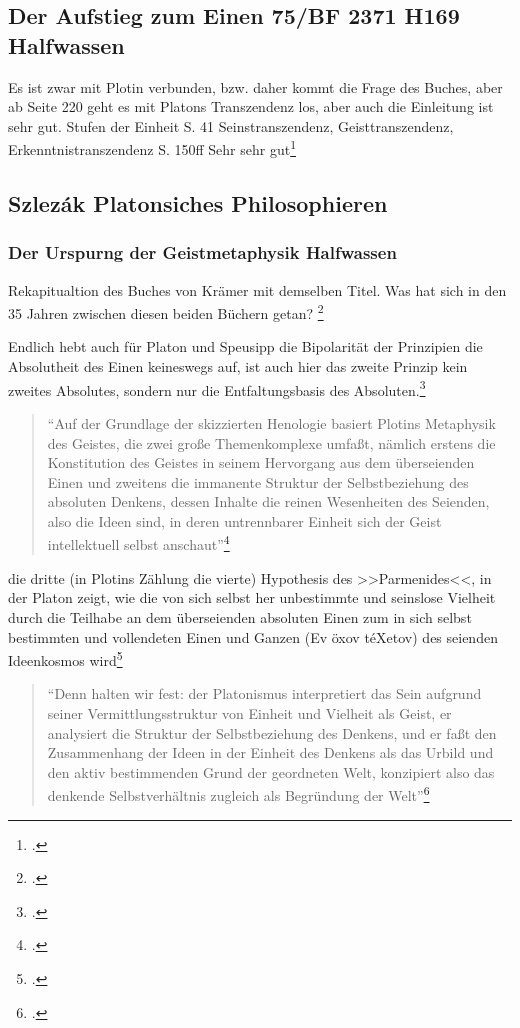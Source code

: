 \documentclass[12pt]{article}
\newcommand*{\zitatblock}[1]{%
    \begin{quote}
    \fontsize{10}{12}\selectfont
    \setlength{\parskip}{1.0em}
    #1
    \end{quote}
}
\begin{document}
\subsection*{Der Aufstieg zum Einen 75/BF 2371 H169 Halfwassen}
Es ist zwar mit Plotin verbunden, bzw. daher kommt die Frage des Buches, aber ab Seite 220 geht es mit Platons Transzendenz los, aber auch die Einleitung ist sehr gut.
Stufen der Einheit S. 41
Seinstranszendenz, Geisttranszendenz, Erkenntnistranszendenz S. 150ff
Sehr sehr gut\footcite[][]{halfwassenaufstieg2006}
\subsection*{Szlezák Platonsiches Philosophieren}
\subsubsection*{Der Urspurng der Geistmetaphysik Halfwassen}
Rekapitualtion des Buches von Krämer mit demselben Titel. Was hat sich in den 35 Jahren zwischen diesen beiden Büchern getan? \footcite[vgl.][S. 50]{HalfwassenGeistmetaphysik}

Endlich hebt auch für Platon und Speusipp die Bipolarität der Prinzipien die Absolutheit des Einen keineswegs auf, ist auch hier das zweite Prinzip kein zweites Absolutes, sondern nur die Entfaltungsbasis des Absoluten.\footcite[][S. 53]{HalfwassenGeistmetaphysik}

\zitatblock{\enquote{Auf der Grundlage der skizzierten Henologie basiert Plotins Metaphysik des Geistes, die zwei große Themenkomplexe umfaßt, nämlich erstens die Konstitution des Geistes in seinem Hervorgang aus dem überseienden Einen und zweitens die immanente Struktur der Selbstbeziehung des absoluten Denkens, dessen Inhalte die reinen Wesenheiten des Seienden, also die Ideen sind, in deren untrennbarer Einheit sich der Geist intellektuell selbst anschaut}\footcite[][S. 54]{HalfwassenGeistmetaphysik}}

die dritte (in Plotins Zählung die vierte) Hypothesis des >>Parmenides<<, in der Platon zeigt, wie die von sich selbst her unbestimmte und seinslose Vielheit durch die Teilhabe an dem überseienden absoluten Einen zum in sich selbst bestimmten und vollendeten Einen und Ganzen (Ev öxov téXetov) des seienden Ideenkosmos wird\footcite[vgl.][S. 54f.]{HalfwassenGeistmetaphysik}

\zitatblock{\enquote{Denn halten wir fest: der Platonismus interpretiert das Sein aufgrund seiner Vermittlungsstruktur von Einheit und Vielheit als Geist, er analysiert die Struktur der Selbstbeziehung des Denkens, und er faßt den Zusammenhang der Ideen in der Einheit des Denkens als das Urbild und den aktiv bestimmenden Grund der geordneten Welt, konzipiert also das denkende Selbstverhältnis zugleich als Begründung der Welt}\footcite[][S. 60]{HalfwassenGeistmetaphysik}}
\end{document}
